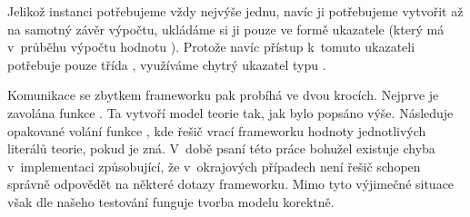 Jelikož instanci  potřebujeme vždy nejvýše jednu, navíc ji potřebujeme vytvořit až na samotný závěr výpočtu, ukládáme si ji pouze ve formě ukazatele (který má v~průběhu výpočtu hodnotu ). Protože navíc přístup k~tomuto ukazateli potřebuje pouze třída , využíváme chytrý ukazatel typu .

Komunikace se zbytkem frameworku pak probíhá ve dvou krocích. Nejprve je zavolána funkce . Ta vytvoří model teorie tak, jak bylo popsáno výše. Následuje opakované volání funkce , kde řešič vrací frameworku hodnoty jednotlivých literálů teorie, pokud je zná. V~době psaní této práce bohužel existuje chyba v~implementaci  způsobující, že v~okrajových případech není řešič schopen správně odpovědět na některé dotazy frameworku. Mimo tyto výjimečné situace však dle našeho testování funguje tvorba modelu korektně.

